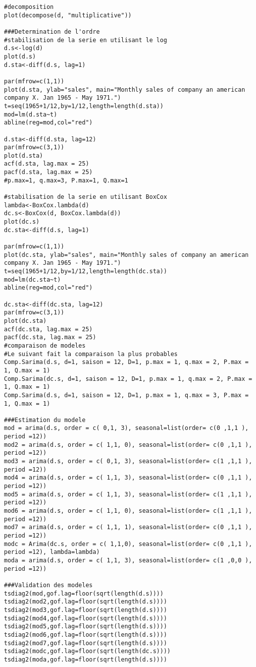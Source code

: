 \documentclass[11pt,a4paper]{article}
\begin{document}
\begin{lstlisting}[breaklines]
#decomposition
plot(decompose(d, "multiplicative")) 

###Determination de l'ordre
#stabilisation de la serie en utilisant le log
d.s<-log(d)
plot(d.s)
d.sta<-diff(d.s, lag=1)

par(mfrow=c(1,1))
plot(d.sta, ylab="sales", main="Monthly sales of company an american company X. Jan 1965 - May 1971.")
t=seq(1965+1/12,by=1/12,length=length(d.sta))
mod=lm(d.sta~t)
abline(reg=mod,col="red")

d.sta<-diff(d.sta, lag=12)
par(mfrow=c(3,1))
plot(d.sta)
acf(d.sta, lag.max = 25)
pacf(d.sta, lag.max = 25)
#p.max=1, q.max=3, P.max=1, Q.max=1

#stabilisation de la serie en utilisant BoxCox
lambda<-BoxCox.lambda(d)
dc.s<-BoxCox(d, BoxCox.lambda(d))
plot(dc.s)
dc.sta<-diff(d.s, lag=1)

par(mfrow=c(1,1))
plot(dc.sta, ylab="sales", main="Monthly sales of company an american company X. Jan 1965 - May 1971.")
t=seq(1965+1/12,by=1/12,length=length(dc.sta))
mod=lm(dc.sta~t)
abline(reg=mod,col="red")

dc.sta<-diff(dc.sta, lag=12)
par(mfrow=c(3,1))
plot(dc.sta)
acf(dc.sta, lag.max = 25)
pacf(dc.sta, lag.max = 25)
#comparaison de modeles
#Le suivant fait la comparaison la plus probables
Comp.Sarima(d.s, d=1, saison = 12, D=1, p.max = 1, q.max = 2, P.max = 1, Q.max = 1)
Comp.Sarima(dc.s, d=1, saison = 12, D=1, p.max = 1, q.max = 2, P.max = 1, Q.max = 1)
Comp.Sarima(d.s, d=1, saison = 12, D=1, p.max = 1, q.max = 3, P.max = 1, Q.max = 1)

###Estimation du modele
mod = arima(d.s, order = c( 0,1, 3), seasonal=list(order= c(0 ,1,1 ), period =12))
mod2 = arima(d.s, order = c( 1,1, 0), seasonal=list(order= c(0 ,1,1 ), period =12))
mod3 = arima(d.s, order = c( 0,1, 3), seasonal=list(order= c(1 ,1,1 ), period =12))
mod4 = arima(d.s, order = c( 1,1, 3), seasonal=list(order= c(0 ,1,1 ), period =12))
mod5 = arima(d.s, order = c( 1,1, 3), seasonal=list(order= c(1 ,1,1 ), period =12))
mod6 = arima(d.s, order = c( 1,1, 0), seasonal=list(order= c(1 ,1,1 ), period =12))
mod7 = arima(d.s, order = c( 1,1, 1), seasonal=list(order= c(0 ,1,1 ), period =12))
modc = Arima(dc.s, order = c( 1,1,0), seasonal=list(order= c(0 ,1,1 ), period =12), lambda=lambda)
moda = arima(d.s, order = c( 1,1, 3), seasonal=list(order= c(1 ,0,0 ), period =12))

###Validation des modeles
tsdiag2(mod,gof.lag=floor(sqrt(length(d.s))))
tsdiag2(mod2,gof.lag=floor(sqrt(length(d.s))))
tsdiag2(mod3,gof.lag=floor(sqrt(length(d.s))))
tsdiag2(mod4,gof.lag=floor(sqrt(length(d.s))))
tsdiag2(mod5,gof.lag=floor(sqrt(length(d.s))))
tsdiag2(mod6,gof.lag=floor(sqrt(length(d.s))))
tsdiag2(mod7,gof.lag=floor(sqrt(length(d.s))))
tsdiag2(modc,gof.lag=floor(sqrt(length(dc.s))))
tsdiag2(moda,gof.lag=floor(sqrt(length(d.s))))


\end{lstlisting}
\end{document}
